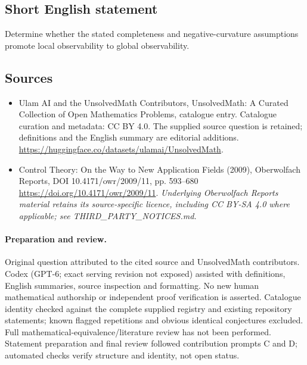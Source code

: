\documentclass[11pt]{article}
\begin{document}
\subsection{Short English statement}
Determine whether the stated completeness and negative-curvature assumptions promote local observability to global observability.
\subsection{Sources}
\begin{itemize}
\item[\hypertarget{source:statement:1}{S1}] Ulam AI and the UnsolvedMath Contributors, UnsolvedMath: A Curated Collection of Open Mathematics Problems, catalogue entry. Catalogue curation and metadata: CC BY 4.0. The supplied source question is retained; definitions and the English summary are editorial additions.
\url{https://huggingface.co/datasets/ulamai/UnsolvedMath}.
\item[\hypertarget{source:statement:2}{S2}] Control Theory: On the Way to New Application Fields (2009), Oberwolfach Reports, DOI 10.4171/owr/2009/11, pp. 593--680
\url{https://doi.org/10.4171/owr/2009/11}.
\textit{Underlying Oberwolfach Reports material retains its source-specific licence, including CC BY-SA 4.0 where applicable; see THIRD\_PARTY\_NOTICES.md.}
\end{itemize}
\paragraph{Preparation and review.}
Original question attributed to the cited source and UnsolvedMath contributors. Codex (GPT-6; exact serving revision not exposed) assisted with definitions, English summaries, source inspection and formatting. No new human mathematical authorship or independent proof verification is asserted. Catalogue identity checked against the complete supplied registry and existing repository statements; known flagged repetitions and obvious identical conjectures excluded. Full mathematical-equivalence/literature review has not been performed. Statement preparation and final review followed contribution prompts C and D; automated checks verify structure and identity, not open status.
\label{end:statement}
\end{document}
